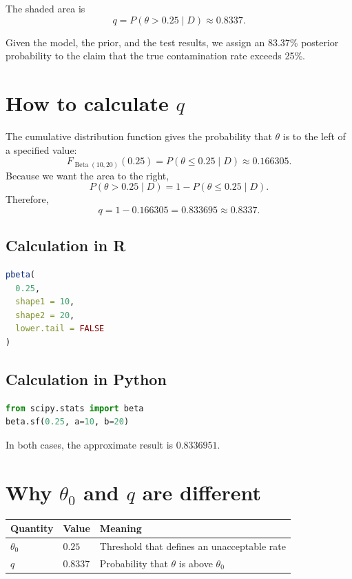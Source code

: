 \documentclass[11pt,letter]{article}
\begin{document}
The shaded area is
\[
q=P(\theta>0.25\mid D)\approx0.8337.
\]

\begin{ideia}
Given the model, the prior, and the test results, we assign an 83.37\%
posterior probability to the claim that the true contamination rate exceeds
25\%.
\end{ideia}

\section{How to calculate $q$}

The cumulative distribution function gives the probability that $\theta$ is to
the left of a specified value:
\[
F_{\operatorname{Beta}(10,20)}(0.25)
=P(\theta\leq0.25\mid D)
\approx0.166305.
\]
Because we want the area to the right,
\[
P(\theta>0.25\mid D)=1-P(\theta\leq0.25\mid D).
\]
Therefore,
\[
q=1-0.166305=0.833695\approx0.8337.
\]

\subsection{Calculation in R}

\begin{lstlisting}[language=R]
pbeta(
  0.25,
  shape1 = 10,
  shape2 = 20,
  lower.tail = FALSE
)
\end{lstlisting}

\subsection{Calculation in Python}

\begin{lstlisting}[language=Python]
from scipy.stats import beta
beta.sf(0.25, a=10, b=20)
\end{lstlisting}

In both cases, the approximate result is $0.8336951$.

\section{Why $\theta_0$ and $q$ are different}

\begin{center}
\begin{tabular}{lll}
\toprule
Quantity & Value & Meaning \\
\midrule
$\theta_0$ & $0.25$ & Threshold that defines an unacceptable rate \\
$q$ & $0.8337$ & Probability that $\theta$ is above $\theta_0$ \\
\bottomrule
\end{tabular}
\end{center}
\end{document}
